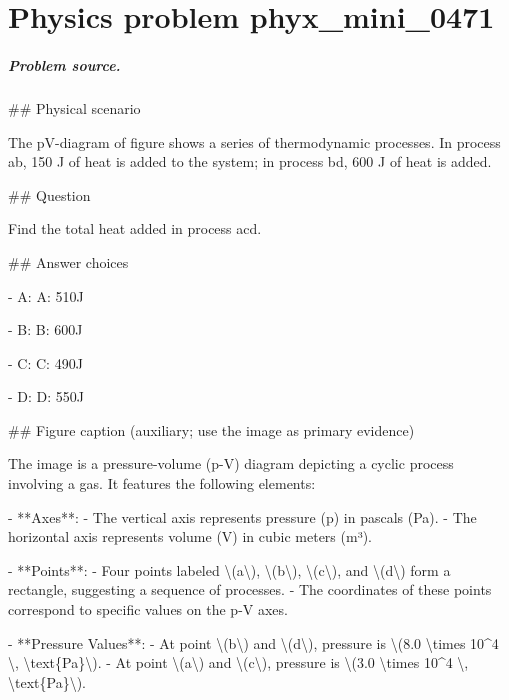 
\chapter{Physics problem phyx\_mini\_0471}
\label{ch:PhyXMiniProblems_problem_phyx_mini_0471}

\paragraph{Problem source.}
\#\# Physical scenario

The pV-diagram of figure shows a series of thermodynamic processes. In process ab, 150 J of heat is added to the system; in process bd, 600 J of heat is added.

\#\# Question

Find the total heat added in process acd.

\#\# Answer choices

- A: A: 510J

- B: B: 600J

- C: C: 490J

- D: D: 550J

\#\# Figure caption (auxiliary; use the image as primary evidence)

The image is a pressure-volume (p-V) diagram depicting a cyclic process involving a gas. It features the following elements:

- **Axes**: 
  - The vertical axis represents pressure (p) in pascals (Pa).
  - The horizontal axis represents volume (V) in cubic meters (m³).

- **Points**:
  - Four points labeled \textbackslash{}(a\textbackslash{}), \textbackslash{}(b\textbackslash{}), \textbackslash{}(c\textbackslash{}), and \textbackslash{}(d\textbackslash{}) form a rectangle, suggesting a sequence of processes.
  - The coordinates of these points correspond to specific values on the p-V axes.

- **Pressure Values**:
  - At point \textbackslash{}(b\textbackslash{}) and \textbackslash{}(d\textbackslash{}), pressure is \textbackslash{}(8.0 \textbackslash{}times 10\textasciicircum{}4 \textbackslash{}, \textbackslash{}text\{Pa\}\textbackslash{}).
  - At point \textbackslash{}(a\textbackslash{}) and \textbackslash{}(c\textbackslash{}), pressure is \textbackslash{}(3.0 \textbackslash{}times 10\textasciicircum{}4 \textbackslash{}, \textbackslash{}text\{Pa\}\textbackslash{}).

